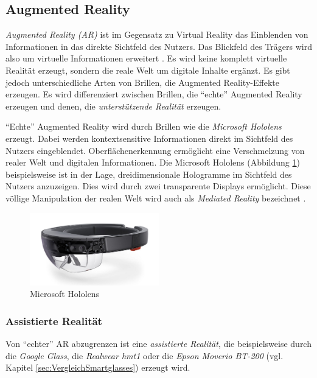 \subsection{Augmented Reality}
%
\emph{Augmented Reality (AR)} ist im Gegensatz zu Virtual Reality das Einblenden von Informationen in das direkte Sichtfeld des Nutzers. Das Blickfeld des Trägers wird also um virtuelle Informationen erweitert \cite[S.~26]{Schwenke2016}. Es wird keine komplett virtuelle Realität erzeugt, sondern die reale Welt um digitale Inhalte ergänzt. Es gibt jedoch unterschiedliche Arten von Brillen, die Augmented Reality-Effekte erzeugen. Es wird differenziert zwischen Brillen, die \enquote{echte} Augmented Reality erzeugen und denen, die \emph{unterstützende Realität} erzeugen.

\enquote{Echte} Augmented Reality wird durch Brillen wie die \emph{Microsoft Hololens} erzeugt. Dabei werden kontextsensitive Informationen direkt im Sichtfeld des Nutzers eingeblendet. Oberflächenerkennung ermöglicht eine Verschmelzung von realer Welt und digitalen Informationen. Die Microsoft Hololens (Abbildung \ref{fig:Microsoft_Hololens}) beispielsweise ist in der Lage, dreidimensionale Hologramme im Sichtfeld des Nutzers anzuzeigen. Dies wird durch zwei transparente Displays ermöglicht. Diese völlige Manipulation der realen Welt wird auch als \emph{Mediated Reality} bezeichnet \cite[S.~46]{Schwenke2016}.
%
\begin{figure}[htbp]
    \centering
    \includegraphics[width=0.5\textwidth]{data/bilder/Microsoft_Hololens.pdf}
    \caption{Microsoft Hololens \cite{O.V.}}
    \label{fig:Microsoft_Hololens}
\end{figure}
%
%

\subsubsection{Assistierte Realität}
\label{sec:AssistierteRealitaet}
%
Von \enquote{echter} AR abzugrenzen ist eine \emph{assistierte Realität}, die beispielsweise durch die \emph{Google Glass}, die \emph{Realwear hmt1} oder die \emph{Epson Moverio BT-200} (vgl. Kapitel \ref{sec:VergleichSmartglasses}) erzeugt wird.

